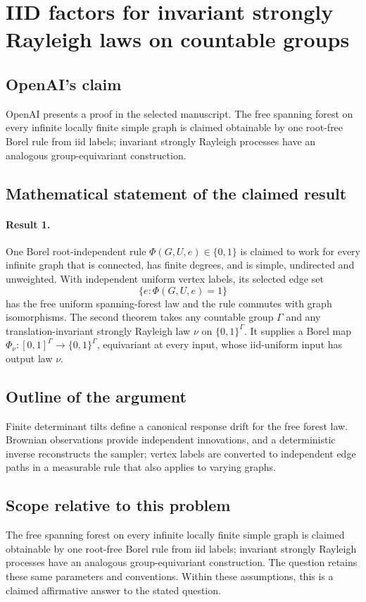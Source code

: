 \documentclass[11pt]{article}
\begin{document}
\section*{IID factors for invariant strongly Rayleigh laws on countable groups}

\subsection{OpenAI's claim}
OpenAI presents a proof in the selected manuscript. The free spanning forest on every infinite locally finite simple graph is claimed obtainable by one root-free Borel rule from iid labels; invariant strongly Rayleigh processes have an analogous group-equivariant construction.

\subsection{Mathematical statement of the claimed result}
\paragraph{Result 1.} One Borel root-independent rule \(\Phi(G,U,e)\in\{0,1\}\) is claimed to work for every infinite graph that is connected, has finite degrees, and is simple, undirected and unweighted. With independent uniform vertex labels, its selected edge set
\[
 \{e:\Phi(G,U,e)=1\}
\]
has the free uniform spanning-forest law and the rule commutes with graph isomorphisms. The second theorem takes any countable group \(\Gamma\) and any translation-invariant strongly Rayleigh law \(\nu\) on \(\{0,1\}^\Gamma\). It supplies a Borel map \(\Phi_\nu:[0,1]^\Gamma\to\{0,1\}^\Gamma\), equivariant at every input, whose iid-uniform input has output law \(\nu\).

\subsection{Outline of the argument}
Finite determinant tilts define a canonical response drift for the free forest law. Brownian observations provide independent innovations, and a deterministic inverse reconstructs the sampler; vertex labels are converted to independent edge paths in a measurable rule that also applies to varying graphs.

\subsection{Scope relative to this problem}
The free spanning forest on every infinite locally finite simple graph is claimed obtainable by one root-free Borel rule from iid labels; invariant strongly Rayleigh processes have an analogous group-equivariant construction. The question retains these same parameters and conventions. Within these assumptions, this is a claimed affirmative answer to the stated question.
\end{document}
